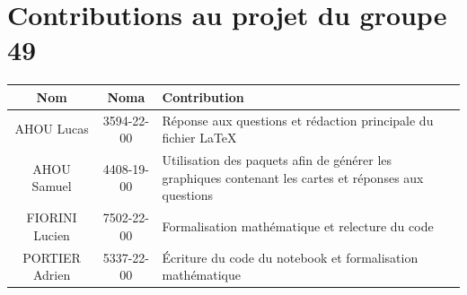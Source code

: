 \documentclass{article}
\begin{document}
\section*{Contributions au projet du groupe 49}
\begin{table}[h]
    \centering
    \begin{tabular}{|c|c|p{6cm}|}
        \hline
        \textbf{Nom} & \textbf{Noma} & \textbf{Contribution} \\
        \hline
        AHOU Lucas & 3594-22-00 & Réponse aux questions et rédaction principale du fichier \LaTeX \\
        \hline
        AHOU Samuel & 4408-19-00 & Utilisation des paquets afin de générer les graphiques contenant les cartes et réponses aux questions \\
        \hline
        FIORINI Lucien & 7502-22-00 & Formalisation mathématique et relecture du code \\
        \hline
        PORTIER Adrien & 5337-22-00 & Écriture du code du notebook et formalisation mathématique \\
        \hline
    \end{tabular}
\end{table}
\end{document}
